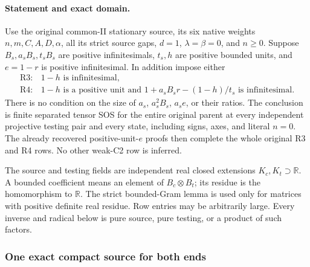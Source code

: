 \label{p1de8b5ffab69:sec:new-r34-all-tests}

\paragraph{Statement and exact domain.}
Use the original common-II stationary source, its six native weights
$n,m,C,A,D,\alpha$, all its strict source gaps, $d=1$,
$\lambda=\beta=0$, and $n\geq0$. Suppose $B_s,a_sB_s,t_sB_s$
are positive infinitesimals, $t_s,h$ are positive bounded units,
and $e=1-r$ is positive infinitesimal. In addition impose either
\[
 \begin{array}{ll}
 \mathrm{R3}:&1-h\text{ is infinitesimal},\\
 \mathrm{R4}:&1-h\text{ is a positive unit and }
       1+a_sB_sr-(1-h)/t_s\text{ is infinitesimal}.
 \end{array}                                                    \tag{EN1}
\]
There is no condition on the size of $a_s$, $a_s^2B_s$,
$a_s e$, or their ratios. The conclusion is finite separated tensor
SOS for the entire original parent at every independent projective
testing pair and every state, including signs, axes, and literal $n=0$.
The already recovered positive-unit-$e$ proofs then complete the
whole original R3 and R4 rows. No other weak-C2 row is inferred.

The source and testing fields are independent real closed extensions
$K_c,K_t\supset\mathbb R$. A bounded coefficient means an element
of $B_c\otimes B_t$; its residue is the homomorphism to $\mathbb R$.
The strict bounded-Gram lemma is used only for matrices with positive
definite real residue. Row entries may be arbitrarily large.
Every inverse and radical below is pure source, pure testing, or a
product of such factors.

\subsubsection*{One exact compact source for both ends}

